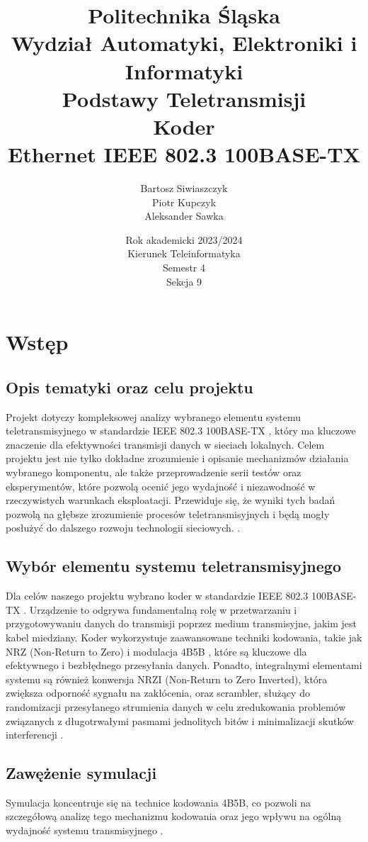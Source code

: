 \documentclass{article}
\title{
  Politechnika Śląska \\
  Wydział Automatyki, Elektroniki i Informatyki \\
  Podstawy Teletransmisji \\
  \vspace{120pt} 
  \textbf{Koder} \\
  Ethernet IEEE 802.3 100BASE-TX
  \vspace{120pt} 
}
\author{
  Bartosz Siwiaszczyk \\
  Piotr Kupczyk \\
  Aleksander Sawka
}
\date{
\vspace{10pt}
  Rok akademicki 2023/2024 \\
  Kierunek Teleinformatyka \\
  Semestr 4 \\
  Sekcja 9
}
\begin{document}
\maketitle
\newpage
\tableofcontents 
\newpage 

\section{Wstęp}
\subsection{Opis tematyki oraz celu projektu}
Projekt dotyczy kompleksowej analizy wybranego elementu systemu teletransmisyjnego w standardzie IEEE 802.3 100BASE-TX \cite{ieee802}, który ma kluczowe znaczenie dla efektywności transmisji danych w sieciach lokalnych. 
Celem projektu jest nie tylko dokładne zrozumienie i opisanie mechanizmów działania wybranego komponentu, ale także przeprowadzenie serii testów oraz eksperymentów, które pozwolą ocenić jego wydajność i niezawodność w rzeczywistych warunkach eksploatacji. 
Przewiduje się, że wyniki tych badań pozwolą na głębsze zrozumienie procesów teletransmisyjnych i będą mogły posłużyć do dalszego rozwoju technologii sieciowych. \cite{networkencyclopedia}.

\subsection{Wybór elementu systemu teletransmisyjnego}
Dla celów naszego projektu wybrano koder w standardzie IEEE 802.3 100BASE-TX \cite{ieee802}.
Urządzenie to odgrywa fundamentalną rolę w przetwarzaniu i przygotowywaniu danych do transmisji poprzez medium transmisyjne, jakim jest kabel miedziany. 
Koder wykorzystuje zaawansowane techniki kodowania, takie jak NRZ (Non-Return to Zero) i modulacja 4B5B \cite{patent}, które są kluczowe dla efektywnego i bezbłędnego przesyłania danych. Ponadto, integralnymi elementami systemu są również konwersja NRZI (Non-Return to Zero Inverted), która zwiększa odporność sygnału na zakłócenia, oraz scrambler, służący do randomizacji przesyłanego strumienia danych w celu zredukowania problemów związanych z długotrwałymi pasmami jednolitych bitów i minimalizacji skutków interferencji \cite{actel}.

\subsection{Zawężenie symulacji}
Symulacja koncentruje się na technice kodowania 4B5B, co pozwoli na szczegółową analizę tego mechanizmu kodowania oraz jego wpływu na ogólną wydajność systemu transmisyjnego \cite{actel}.
\end{document}
